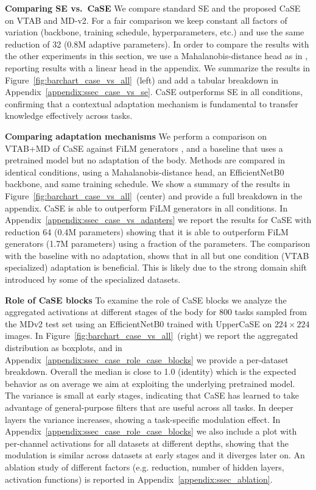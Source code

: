\documentclass{article}
\begin{document}
\textbf{Comparing SE vs.~CaSE} We compare standard SE and the proposed CaSE on VTAB and MD-v2. For a fair comparison we keep constant all factors of variation (backbone, training schedule, hyperparameters, etc.) and use the same reduction of 32 (0.8M adaptive parameters). In order to compare the results with the other experiments in this section, we use a Mahalanobis-distance head as in \cite{bronskill2021memory}, reporting results with a linear head in the appendix. We summarize the results in Figure~\ref{fig:barchart_case_vs_all}~(left) and add a tabular breakdown in Appendix~\ref{appendix:ssec_case_vs_se}. CaSE outperforms SE in all conditions, confirming that a contextual adaptation mechanism is fundamental to transfer knowledge effectively across tasks.

\textbf{Comparing adaptation mechanisms} We perform a comparison on VTAB+MD of CaSE against FiLM generators \citep{bronskill2021memory}, and a baseline that uses a pretrained model but no adaptation of the body. Methods are compared in identical conditions, using a Mahalanobis-distance head, an EfficientNetB0 backbone, and same training schedule.
We show a summary of the results in Figure~\ref{fig:barchart_case_vs_all}~(center) and provide a full breakdown in the appendix. CaSE is able to outperform FiLM generators in all conditions. In Appendix~\ref{appendix:ssec_case_vs_adapters} we report the results for CaSE with reduction 64 (0.4M parameters) showing that it is able to outperform FiLM generators (1.7M parameters) using a fraction of the parameters. The comparison with the baseline with no adaptation, shows that in all but one condition (VTAB specialized) adaptation is beneficial. This is likely due to the strong domain shift introduced by some of the specialized datasets.


\textbf{Role of CaSE blocks} To examine the role of CaSE blocks we analyze the aggregated activations at different stages of the body for 800 tasks sampled from the MDv2 test set using an EfficientNetB0 trained with UpperCaSE on $224 \times 224$ images.
In Figure~\ref{fig:barchart_case_vs_all}~(right) we report the aggregated distribution as boxplots, and in Appendix~\ref{appendix:ssec_case_role_case_blocks} we provide a per-dataset breakdown. Overall the median is close to 1.0 (identity) which is the expected behavior as on average we aim at exploiting the underlying pretrained model. The variance is small at early stages, indicating that CaSE has learned to take advantage of general-purpose filters that are useful across all tasks. In deeper layers the variance increases, showing a task-specific modulation effect. In Appendix~\ref{appendix:ssec_case_role_case_blocks} we also include a plot with per-channel activations for all datasets at different depths, showing that the modulation is similar across datasets at early stages and it diverges later on. An ablation study of different factors (e.g. reduction, number of hidden layers, activation functions) is reported in Appendix~\ref{appendix:ssec_ablation}.
\end{document}
